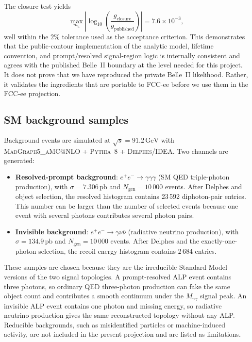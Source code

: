 \documentclass[12pt,a4paper]{article}
\newcommand{\ma}{m_a}
\newcommand{\sqrts}{\sqrt{s}}
\newcommand{\GeV}{\,\text{GeV}}
\begin{document}
The closure test yields
\begin{equation}
    \max_{\ma}
    \left|\log_{10}\!\left(\frac{g_\mathrm{closure}}{g_\mathrm{published}}\right)\right|
    = 7.6\times10^{-3},
    \label{eq:closure}
\end{equation}
well within the 2\% tolerance used as the acceptance criterion.
This demonstrates that the public-contour implementation of the analytic
model, lifetime convention, and prompt/resolved signal-region logic is
internally consistent and agrees with the published Belle~II boundary at the
level needed for this project.
It does not prove that we have reproduced the private Belle~II likelihood.
Rather, it validates the ingredients that are portable to FCC-ee before we use
them in the FCC-ee projection.

\subsection{SM background samples}

Background events are simulated at $\sqrts = 91.2\GeV$ with
\textsc{MadGraph5\_aMC@NLO} + \textsc{Pythia~8} + \textsc{Delphes/IDEA}.
Two channels are generated:
\begin{itemize}
    \item \textbf{Resolved-prompt background}: $e^+e^-\to\gamma\gamma\gamma$
    (SM QED triple-photon production),
    with $\sigma = 7.306\,\text{pb}$ and $N_\mathrm{gen} = 10\,000$ events.
    After Delphes and object selection, the resolved histogram contains
    23\,592 diphoton-pair entries. This number can be larger than the number of
    selected events because one event with several photons contributes several
    photon pairs.

    \item \textbf{Invisible background}: $e^+e^-\to\gamma\nu\bar{\nu}$
    (radiative neutrino production),
    with $\sigma = 134.9\,\text{pb}$ and $N_\mathrm{gen} = 10\,000$ events.
    After Delphes and the exactly-one-photon selection, the recoil-energy
    histogram contains 2\,684 entries.
\end{itemize}

These samples are chosen because they are the irreducible Standard Model
versions of the two signal topologies. A prompt-resolved ALP event contains
three photons, so ordinary QED three-photon production can fake the same object
count and contributes a smooth continuum under the $M_{\gamma\gamma}$ signal
peak. An invisible ALP event contains one photon and missing energy, so
radiative neutrino production gives the same reconstructed topology without
any ALP. Reducible backgrounds, such as misidentified particles or
machine-induced activity, are not included in the present projection and are
listed as limitations.
\end{document}
